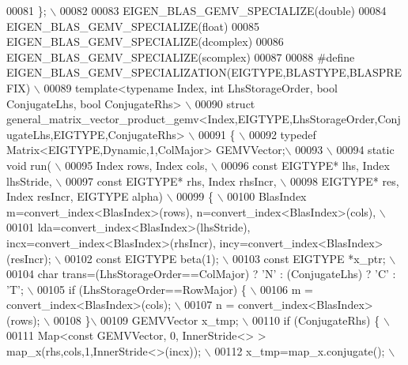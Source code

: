 \begin{DoxyCode}
00081 \textcolor{preprocessor}{\}; \(\backslash\)}
00082 \textcolor{preprocessor}{}
00083 EIGEN\_BLAS\_GEMV\_SPECIALIZE(\textcolor{keywordtype}{double})
00084 EIGEN\_BLAS\_GEMV\_SPECIALIZE(\textcolor{keywordtype}{float})
00085 EIGEN\_BLAS\_GEMV\_SPECIALIZE(dcomplex)
00086 EIGEN\_BLAS\_GEMV\_SPECIALIZE(scomplex)
00087 
00088 \textcolor{preprocessor}{#define EIGEN\_BLAS\_GEMV\_SPECIALIZATION(EIGTYPE,BLASTYPE,BLASPREFIX) \(\backslash\)}
00089 \textcolor{preprocessor}{template<typename Index, int LhsStorageOrder, bool ConjugateLhs, bool ConjugateRhs> \(\backslash\)}
00090 \textcolor{preprocessor}{struct general\_matrix\_vector\_product\_gemv<Index,EIGTYPE,LhsStorageOrder,ConjugateLhs,EIGTYPE,ConjugateRhs> 
      \(\backslash\)}
00091 \textcolor{preprocessor}{\{ \(\backslash\)}
00092 \textcolor{preprocessor}{typedef Matrix<EIGTYPE,Dynamic,1,ColMajor> GEMVVector;\(\backslash\)}
00093 \textcolor{preprocessor}{\(\backslash\)}
00094 \textcolor{preprocessor}{static void run( \(\backslash\)}
00095 \textcolor{preprocessor}{  Index rows, Index cols, \(\backslash\)}
00096 \textcolor{preprocessor}{  const EIGTYPE* lhs, Index lhsStride, \(\backslash\)}
00097 \textcolor{preprocessor}{  const EIGTYPE* rhs, Index rhsIncr, \(\backslash\)}
00098 \textcolor{preprocessor}{  EIGTYPE* res, Index resIncr, EIGTYPE alpha) \(\backslash\)}
00099 \textcolor{preprocessor}{\{ \(\backslash\)}
00100 \textcolor{preprocessor}{  BlasIndex m=convert\_index<BlasIndex>(rows), n=convert\_index<BlasIndex>(cols), \(\backslash\)}
00101 \textcolor{preprocessor}{            lda=convert\_index<BlasIndex>(lhsStride), incx=convert\_index<BlasIndex>(rhsIncr),
       incy=convert\_index<BlasIndex>(resIncr); \(\backslash\)}
00102 \textcolor{preprocessor}{  const EIGTYPE beta(1); \(\backslash\)}
00103 \textcolor{preprocessor}{  const EIGTYPE *x\_ptr; \(\backslash\)}
00104 \textcolor{preprocessor}{  char trans=(LhsStorageOrder==ColMajor) ? 'N' : (ConjugateLhs) ? 'C' : 'T'; \(\backslash\)}
00105 \textcolor{preprocessor}{  if (LhsStorageOrder==RowMajor) \{ \(\backslash\)}
00106 \textcolor{preprocessor}{    m = convert\_index<BlasIndex>(cols); \(\backslash\)}
00107 \textcolor{preprocessor}{    n = convert\_index<BlasIndex>(rows); \(\backslash\)}
00108 \textcolor{preprocessor}{  \}\(\backslash\)}
00109 \textcolor{preprocessor}{  GEMVVector x\_tmp; \(\backslash\)}
00110 \textcolor{preprocessor}{  if (ConjugateRhs) \{ \(\backslash\)}
00111 \textcolor{preprocessor}{    Map<const GEMVVector, 0, InnerStride<> > map\_x(rhs,cols,1,InnerStride<>(incx)); \(\backslash\)}
00112 \textcolor{preprocessor}{    x\_tmp=map\_x.conjugate(); \(\backslash\)}

\end{DoxyCode}
